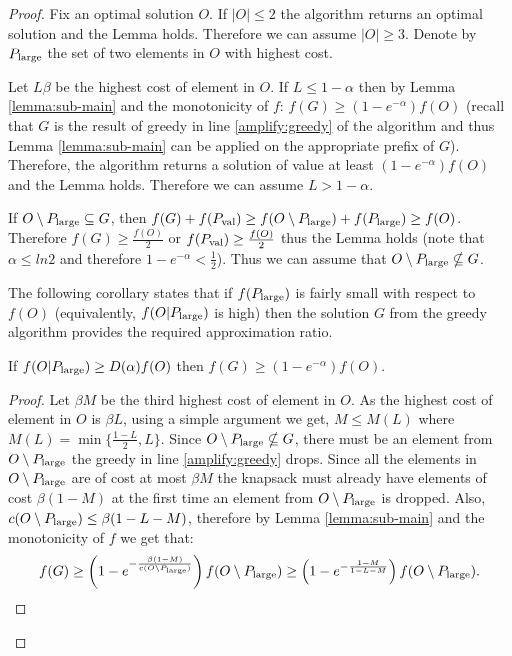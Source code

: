 \documentclass[a4paper,UKenglish,cleveref, autoref]{lipics-v2019}
\begin{document}
\begin{proof}

	Fix an optimal solution $O$.
	 If $|O|\leq 2$ the algorithm returns an optimal solution and the Lemma holds.
	Therefore we can assume $|O| \geq 3$.  Denote by $P_{\text{large}}$ the set of  two  elements in $O$ with highest cost.
	
	Let $L\beta$ be the highest cost of element in $O$.  If $L\leq 1-\alpha$ then
	by Lemma \ref{lemma:sub-main} and the monotonicity of $f$: $f(G) \geq (1-e^{-\alpha}) f(O)$  (recall that $G$ is the result of
	greedy in line \ref{amplify:greedy} of the algorithm and thus Lemma \ref{lemma:sub-main} can be applied on the appropriate prefix of $G$). Therefore, the algorithm
	returns a solution of value at least $(1-e^{-\alpha})f(O)$ and the Lemma holds. Therefore we can assume  $L> 1-\alpha$.
%
	
	If $O\setminus P_{\text{large}} \subseteq G$, then
	$f(G)+ f(P_{\text{val}})\geq f(O\setminus P_{\text{large}}) + f(P_{\text{large}}) \geq f(O)$.
	Therefore $f(G)\geq \frac{f(O)}{2}$ or $f(P_{\text{val}})\geq \frac{f(O)}{2}$
	thus the Lemma holds (note that $\alpha \leq ln 2$ and therefore
	$1-e^{-\alpha} < \frac{1}{2}$). Thus we can assume that
	$O\setminus P_{\text{large}} \nsubseteq G$.
	
	The following corollary states that if $f(P_{\text{large}})$ is fairly small
	with respect to $f(O)$ (equivalently, $f(O|P_{\text{large}})$ is high) then the solution $G$ from the greedy algorithm provides
	the required approximation ratio.
	
	\begin{corollary}
		\label{corollary:cor1}
	If $f(O|P_{\text{large}}) \geq D(\alpha) f(O)$ then $f(G)\geq (1-e^{-\alpha})f(O)$.
	\end{corollary}

\begin{proof}
	

	Let $\beta M$ be the third highest cost of element in  $O$.
	As the highest cost of  element in $O$ is $\beta L$,
	using a simple argument we get, $M\leq M(L)$ where $M(L)= \min \{\frac{1-L}{2}, L\}$. Since
	$O\setminus P_{\text{large}} \nsubseteq G$, there must be an element from $O \setminus P_{\text{large}}$ the greedy in line \ref{amplify:greedy} drops. Since all the elements
	in $O\setminus P_{\text{large}}$ are of cost at most $\beta M$ the knapsack must
	already have elements of cost $\beta (1-M)$ at the first time an element from $O\setminus P_{\text{large}}$ is dropped. Also, $c(O\setminus P_{\text{large}}) \leq \beta(1-L -M)$, therefore by Lemma \ref{lemma:sub-main} and the monotonicity of $f$ we get that:
  	$$f(G)\geq \left(1-e^{- \frac{\beta (1-M) }{c(O\setminus P_{\text{large}})}}\right) f(O\setminus P_{\text{large}})
  			\geq \left(1-e^{- \frac{1-M }{1-L-M}}\right) f(O\setminus P_{\text{large}}) .$$
  			

\end{proof}
\end{proof}
\end{document}
